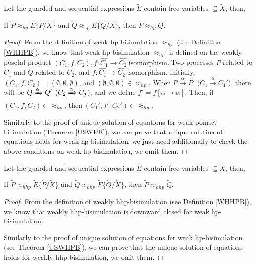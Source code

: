 \begin{theorem}\label{USWHPB}
Let the guarded and sequential expressions $\widetilde{E}$ contain free variables $\subseteq \widetilde{X}$, then,

If $\widetilde{P}\approx_{hp} \widetilde{E}\{\widetilde{P}/\widetilde{X}\}$ and $\widetilde{Q}\approx_{hp} \widetilde{E}\{\widetilde{Q}/\widetilde{X}\}$, then $\widetilde{P}\approx_{hp} \widetilde{Q}$.
\end{theorem}

\begin{proof}
From the definition of weak hp-bisimulation $\approx_{hp}$ (see Definition \ref{WHHPB}), we know that weak hp-bisimulation $\approx_{hp}$ is defined on the weakly posetal product $(C_1,f,C_2),f:\hat{C_1}\rightarrow \hat{C_2}\textrm{ isomorphism}$. Two processes $P$ related to $C_1$ and $Q$ related to $C_2$, and $f:\hat{C_1}\rightarrow \hat{C_2}\textrm{ isomorphism}$. Initially, $(C_1,f,C_2)=(\emptyset,\emptyset,\emptyset)$, and $(\emptyset,\emptyset,\emptyset)\in\approx_{hp}$. When $P\xrightarrow{\alpha}P'$ ($C_1\xrightarrow{\alpha}C_1'$), there will be $Q\xRightarrow{\alpha}Q'$ ($C_2\xRightarrow{\alpha}C_2'$), and we define $f'=f[\alpha\mapsto \alpha]$. Then, if $(C_1,f,C_2)\in\approx_{hp}$, then $(C_1',f',C_2')\in\approx_{hp}$.

Similarly to the proof of unique solution of equations for weak pomset bisimulation (Theorem \ref{USWPB}), we can prove that unique solution of equations holds for weak hp-bisimulation, we just need additionally to check the above conditions on weak hp-bisimulation, we omit them.
\end{proof}

\begin{theorem}\label{USWHHPB}
Let the guarded and sequential expressions $\widetilde{E}$ contain free variables $\subseteq \widetilde{X}$, then,

If $\widetilde{P}\approx_{hhp} \widetilde{E}\{\widetilde{P}/\widetilde{X}\}$ and $\widetilde{Q}\approx_{hhp} \widetilde{E}\{\widetilde{Q}/\widetilde{X}\}$, then $\widetilde{P}\approx_{hhp} \widetilde{Q}$.
\end{theorem}

\begin{proof}
From the definition of weakly hhp-bisimulation (see Definition \ref{WHHPB}), we know that weakly hhp-bisimulation is downward closed for weak hp-bisimulation.

Similarly to the proof of unique solution of equations for weak hp-bisimulation (see Theorem \ref{USWHPB}), we can prove that the unique solution of equations holds for weakly hhp-bisimulation, we omit them.
\end{proof}
